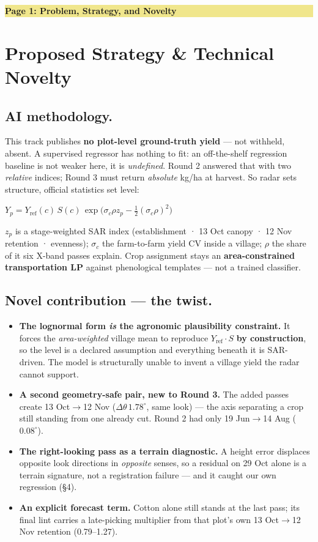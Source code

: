 \documentclass[9pt,a4paper,twocolumn]{extarticle}
\newcommand{\banner}[1]{%
  \vspace{2pt}\noindent\colorbox{khaki}{\parbox{\dimexpr\columnwidth-2\fboxsep}
  {\vspace{0.6pt}\bfseries\color{olive}#1\vspace{0.6pt}}}\vspace{1pt}}
\begin{document}
\banner{Page 1: Problem, Strategy, and Novelty}

\section{Proposed Strategy \& Technical Novelty}

\subsection{AI methodology.} This track publishes \textbf{no plot-level ground-truth yield} — not
withheld, absent. A supervised regressor has nothing to fit: an off-the-shelf regression baseline is
not weaker here, it is \emph{undefined}. Round 2 answered that with two \emph{relative} indices;
Round 3 must return \emph{absolute} kg/ha at harvest. So radar sets structure, official statistics
set level:

\vspace{-3pt}
\begin{center}
$Y_p = Y_{\text{ref}}(c)\,S(c)\,\exp\!\big(\sigma_c\rho z_p-\tfrac12(\sigma_c\rho)^2\big)$
\end{center}
\vspace{-3pt}

$z_p$ is a stage-weighted SAR index (establishment · 13 Oct canopy · 12 Nov retention · evenness);
$\sigma_c$ the farm-to-farm yield CV inside a village; $\rho$ the share of it six X-band passes
explain. Crop assignment stays an \textbf{area-constrained transportation LP} against phenological
templates — not a trained classifier.

\subsection{Novel contribution — the twist.}
\begin{itemize}
\item \textbf{The lognormal form \emph{is} the agronomic plausibility constraint.} It forces the
\emph{area-weighted} village mean to reproduce $Y_{\text{ref}}\!\cdot\!S$ \textbf{by construction},
so the level is a declared assumption and everything beneath it is SAR-driven. The model is
structurally unable to invent a village yield the radar cannot support.
\item \textbf{A second geometry-safe pair, new to Round 3.} The added passes create
13 Oct$\to$12 Nov ($\Delta\theta\,1.78^\circ$, same look) — the axis separating a crop still standing
from one already cut. Round 2 had only 19 Jun$\to$14 Aug ($0.08^\circ$).
\item \textbf{The right-looking pass as a terrain diagnostic.} A height error displaces opposite look
directions in \emph{opposite} senses, so a residual on 29 Oct alone is a terrain signature, not a
registration failure — and it caught our own regression (§4).
\item \textbf{An explicit forecast term.} Cotton alone still stands at the last pass; its final lint
carries a late-picking multiplier from that plot's own 13 Oct$\to$12 Nov retention (0.79–1.27).
\end{itemize}
\end{document}

